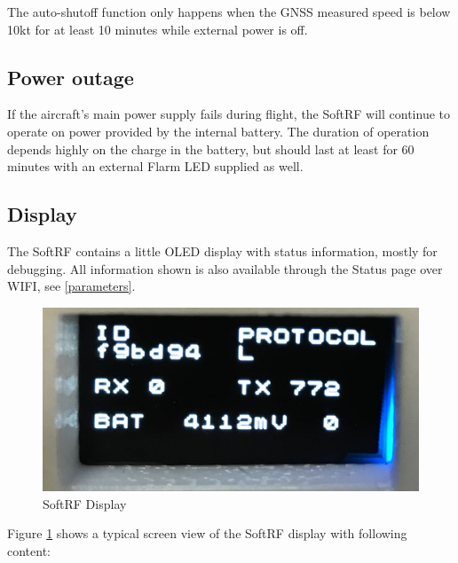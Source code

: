 \documentclass[11pt,a4paper]{article}
\begin{document}
The auto-shutoff function only happens when the GNSS measured speed is below 10kt for at least 10 minutes while external power is off.

\subsection{Power outage}
If the aircraft's main power supply fails during flight, the SoftRF will continue to operate on power provided by the internal battery. The duration of operation depends highly on the charge in the battery, but should last at least for 60 minutes with an external Flarm LED supplied as well.

\begin{center}
\end{center}

\subsection{Display}
The SoftRF contains a little OLED display with status information, mostly for debugging. All information shown is also available through the Status page over WIFI, see \ref{parameters}.

\begin{figure}[h]
\centering
\includegraphics[scale=.1]{display.jpg}
\caption{SoftRF Display}\label{display}
\end{figure}\FloatBarrier

Figure \ref{display} shows a typical screen view of the SoftRF display with following content:
\end{document}
